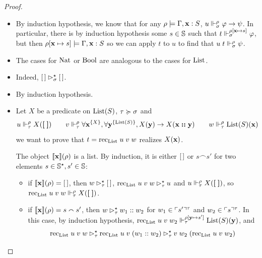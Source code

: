 \documentclass[a4paper,UKenglish,cleveref, autoref, thm-restate]{lipics-v2021}
\begin{document}
\begin{proof}
\begin{itemize}
  \item {} By induction hypothesis, we know that for any $\rho\models \Gamma, \mathbf{x} : S$, $u \Vdash_{\sigma}^{\rho} \varphi \to \psi$. In particular, there is by induction hypothesis some $s \in \mathbb S$ such that $t \Vdash_{\sigma}^{\rho[\mathbf{x} \mapsto s]} \varphi$, but then $\rho[\mathbf{x}\mapsto s]\models \Gamma, \mathbf{x} : S$ so we can apply $t$ to $u$ to find that $u\;t\Vdash_{\sigma}^{\rho} \psi$.
  \item The cases for $\mathrm{Nat}$ or $\mathrm{Bool}$ are analogous to the cases for $\mathrm{List}$.
  \item {} Indeed, $[\,] \rhd^{\star}_{\sigma} [\,]$.
  \item {} By induction hypothesis.
  \item {} Let $X$ be a predicate on $\mathrm{List}(S)$, $\tau \succcurlyeq\sigma$ and
    \[%
    u \realP{\enviroT}{\termenv} X(\termnil)\qquad
    v \realP{\enviroT}{\termenv} \forall \varx^{\{X\}}, \forall \bvary^{\{\List(S)\}}, X(\bvary) \to X(\varx \termcons \bvary)\qquad
    w \realP{\enviroT}{\termenv} \List(S)(\varx)
    \]
    we want to prove that $t = \mathrm{rec}_{\mathrm{List}}\;u\;v\;w$ realizes $X(\mathbf{x})$.

    The object $\llbracket \mathbf{x} \rrbracket(\rho)$ is a list. By induction, it is either $[\,]$ or $s \smallfrown s'$ for two elements $s \in \mathbb S^\star, s' \in \mathbb S$:
    \begin{itemize}
    \item if $\llbracket \mathbf{x} \rrbracket(\rho) = [\,]$, then $w \rhd^{\star}_{\tau} [\,]$, $\mathrm{rec}_{\mathrm{List}}\;u\;v\;w \rhd^{\star}_{\tau} u$ and $u \Vdash_{\tau}^{\rho} X(\boldsymbol[ \; \boldsymbol])$, so $\mathrm{rec}_{\mathrm{List}}\;u\;v\;w\Vdash_{\tau}^{\rho} X(\boldsymbol[ \; \boldsymbol])$.
    \item if $\llbracket \mathbf{x} \rrbracket(\rho) = s \smallfrown s'$, then $w \rhd^{\star}_{\tau} w_1:: w_2$ for $w_1 \in \ulcorner s'\urcorner^{\tau}$ and $w_2\in\ulcorner s\urcorner^{\tau}$. In this case, by induction hypothesis, $\mathrm{rec}_{\mathrm{List}}\;u\;v\;w_2 \Vdash_{\tau}^{\rho[\mathbf{y} \mapsto s']} \mathrm{List}(S)(\mathbf{y})$, and
      \[\mathrm{rec}_{\mathrm{List}}\;u\;v\;w \rhd^{\star}_{\tau} \mathrm{rec}_{\mathrm{List}}\;u\;v\;(w_1:: w_2) \rhd^{\star}_{\tau} v\;w_2\;(\mathrm{rec}_{\mathrm{List}}\;u\;v\;w_2)\qedhere\]
    \end{itemize}
  \end{itemize}
 \end{proof}
\end{document}
